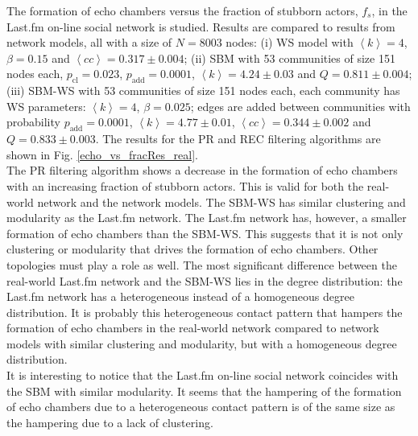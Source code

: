 \documentclass[11 pt , letterpaper , twoside , openright]{book}
\begin{document}
The formation of echo chambers versus the fraction of stubborn actors, $f_s$, in the Last.fm on-line social network is studied. Results are compared to results from network models, all with a size of $N = 8003$ nodes: (i) WS model with $\left<k\right> = 4$, $\beta = 0.15$ and $\left<cc\right> = 0.317 \pm 0.004$; (ii) SBM with 53 communities of size 151 nodes each, $p_\text{cl} = 0.023$, $p_\text{add} = 0.0001$, $\left<k\right> = 4.24 \pm 0.03$ and $Q = 0.811 \pm 0.004$; (iii) SBM-WS with 53 communities of size 151 nodes each, each community has WS parameters: $\left<k\right> = 4$, $\beta = 0.025$; edges are added between communities with probability $p_\text{add} = 0.0001$, $\left<k\right> = 4.77 \pm 0.01$, $\left<cc\right> = 0.344 \pm 0.002$ and $Q = 0.833 \pm 0.003$. The results for the PR and REC filtering algorithms are shown in Fig. \ref{echo_vs_fracRes_real}.\\
\newline
The PR filtering algorithm shows a decrease in the formation of echo chambers with an increasing fraction of stubborn actors. This is valid for both the real-world network and the network models. The SBM-WS has similar clustering and modularity as the Last.fm network. The Last.fm network has, however, a smaller formation of echo chambers than the SBM-WS. This suggests that it is not only clustering or modularity that drives the formation of echo chambers. Other topologies must play a role as well. The most significant difference between the real-world Last.fm network and the SBM-WS lies in the degree distribution: the Last.fm network has a heterogeneous instead of a homogeneous degree distribution. It is probably this heterogeneous contact pattern that hampers the formation of echo chambers in the real-world network compared to network models with similar clustering and modularity, but with a homogeneous degree distribution.\\ %
\newline
It is interesting to notice that the Last.fm on-line social network coincides with the SBM with similar modularity. It seems that the hampering of the formation of echo chambers due to a heterogeneous contact pattern is of the same size as the hampering due to a lack of clustering.
\end{document}
